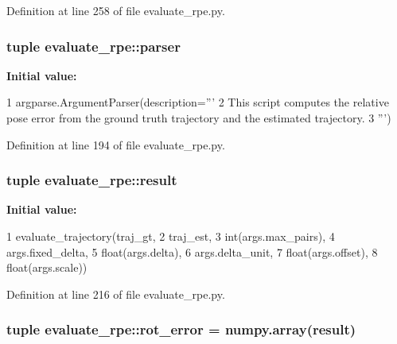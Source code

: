 \-Definition at line 258 of file evaluate\-\_\-rpe.\-py.

\subsubsection[{parser}]{\setlength{\rightskip}{0pt plus 5cm}tuple {\bf evaluate\-\_\-rpe\-::parser}}\label{namespaceevaluate__rpe_a44b450933544c78d01461a6c21241ff4}
{\bfseries \-Initial value\-:}
\begin{DoxyCode}
1 argparse.ArgumentParser(description='''
2     This script computes the relative pose error from the ground truth
       trajectory and the estimated trajectory. 
3     ''')
\end{DoxyCode}


\-Definition at line 194 of file evaluate\-\_\-rpe.\-py.

\subsubsection[{result}]{\setlength{\rightskip}{0pt plus 5cm}tuple {\bf evaluate\-\_\-rpe\-::result}}\label{namespaceevaluate__rpe_ab9508f475c7a0dbbf54aae3a3de416cd}
{\bfseries \-Initial value\-:}
\begin{DoxyCode}
1 evaluate_trajectory(traj_gt,
2                                  traj_est,
3                                  int(args.max_pairs),
4                                  args.fixed_delta,
5                                  float(args.delta),
6                                  args.delta_unit,
7                                  float(args.offset),
8                                  float(args.scale))
\end{DoxyCode}


\-Definition at line 216 of file evaluate\-\_\-rpe.\-py.

\subsubsection[{rot\-\_\-error}]{\setlength{\rightskip}{0pt plus 5cm}tuple {\bf evaluate\-\_\-rpe\-::rot\-\_\-error} = numpy.\-array({\bf result})}\label{namespaceevaluate__rpe_a6e6734ce44f0b67ec6abd7b97ceccde7}


